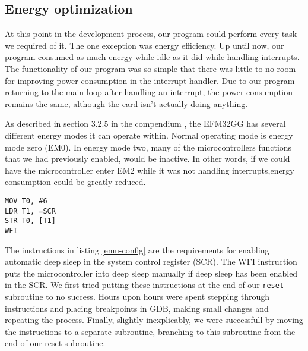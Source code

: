 \subsection{Energy optimization}
\label{sec:energy-optimization}

At this point in the development process, our program could perform every task we required of it. The one exception was energy efficiency. Up until now, our program consumed as much energy while idle as it did while handling interrupts. The functionality of our program was so simple that there was little to no room for improving power consumption in the interrupt handler. Due to our program returning to the main loop after handling an interrupt, the power consumption remains the same, although the card isn't actually doing anything.

As described in section 3.2.5 in the compendium \cite{compendium}, the EFM32GG has several different energy modes it can operate within. Normal operating mode is energy mode zero (EM0). In energy mode two, many of the microcontrollers functions that we had previously enabled, would be inactive. In other words, if we could have the microcontroller enter EM2 while it was not handling interrupts,energy consumption could be greatly reduced.

\begin{lstlisting}[label=emu-config, caption=Enabling automatic deep sleep after interrupt handling]
MOV T0, #6
LDR T1, =SCR
STR T0, [T1]
WFI
\end{lstlisting}

The instructions in listing \ref{emu-config} are the requirements for enabling automatic deep sleep in the system control register (SCR). The WFI instruction puts the microcontroller into deep sleep manually if deep sleep has been enabled in the SCR. We first tried putting these instructions at the end of our \texttt{reset} subroutine to no success. Hours upon hours were spent stepping through instructions and placing breakpoints in GDB, making small changes and repeating the process. Finally, slightly inexplicably, we were successfull by moving the instructions to a separate subroutine, branching to this subroutine from the end of our reset subroutine.

